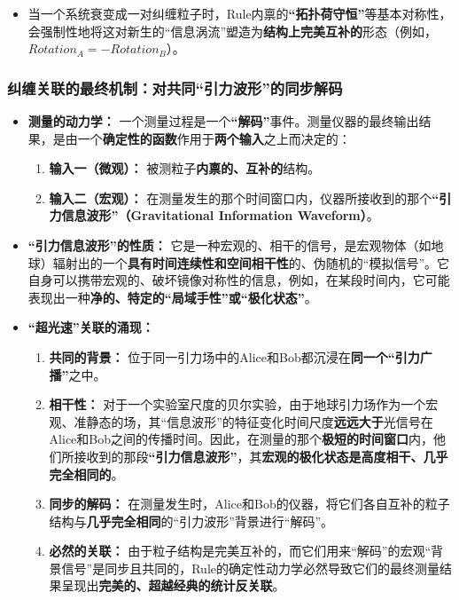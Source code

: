 \documentclass[11pt, a4paper]{article}
\begin{document}
\begin{itemize}
    \item 当一个系统衰变成一对纠缠粒子时，Rule内禀的\textbf{“拓扑荷守恒”}等基本对称性，会强制性地将这对新生的“信息涡流”塑造为\textbf{结构上完美互补的}形态（例如，$Rotation_A = -Rotation_B$）。
\end{itemize}

\subsubsection{纠缠关联的最终机制：对共同“引力波形”的同步解码}

\begin{itemize}
    \item \textbf{测量的动力学：}
    一个测量过程是一个\textbf{“解码”}事件。测量仪器的最终输出结果，是由一个\textbf{确定性的函数}作用于\textbf{两个输入}之上而决定的：
    \begin{enumerate}
        \item \textbf{输入一（微观）：} 被测粒子\textbf{内禀的、互补的}结构。
        \item \textbf{输入二（宏观）：} 在测量发生的那个时间窗口内，仪器所接收到的那个\textbf{“引力信息波形”（Gravitational Information Waveform）}。
    \end{enumerate}

    \item \textbf{“引力信息波形”的性质：}
    它是一种宏观的、相干的信号，是宏观物体（如地球）辐射出的一个\textbf{具有时间连续性和空间相干性}的、伪随机的“模拟信号”。它自身可以携带宏观的、破坏镜像对称性的信息，例如，在某段时间内，它可能表现出一种\textbf{净的、特定的“局域手性”或“极化状态”}。

    \item \textbf{“超光速”关联的涌现：}
    \begin{enumerate}
        \item \textbf{共同的背景：} 位于同一引力场中的Alice和Bob都沉浸在\textbf{同一个“引力广播”}之中。
        \item \textbf{相干性：} 对于一个实验室尺度的贝尔实验，由于地球引力场作为一个宏观、准静态的场，其“信息波形”的特征变化时间尺度\textbf{远远大于}光信号在Alice和Bob之间的传播时间。因此，在测量的那个\textbf{极短的时间窗口}内，他们所接收到的那段\textbf{“引力信息波形”}，其\textbf{宏观的极化状态是高度相干、几乎完全相同的}。
        \item \textbf{同步的解码：} 在测量发生时，Alice和Bob的仪器，将它们各自互补的粒子结构与\textbf{几乎完全相同}的“引力波形”背景进行“解码”。
        \item \textbf{必然的关联：} 由于粒子结构是完美互补的，而它们用来“解码”的宏观“背景信号”是同步且共同的，Rule的确定性动力学必然导致它们的最终测量结果呈现出\textbf{完美的、超越经典的统计反关联}。
    \end{enumerate}
\end{itemize}
\end{document}
